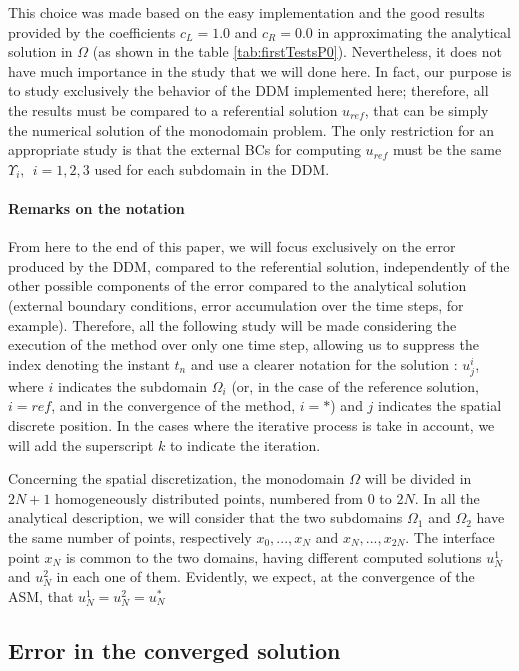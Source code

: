 \indent This choice was made based on the easy implementation and the good results provided by the coefficients $c_L = 1.0$ and $c_R = 0.0$ in approximating the analytical solution in $\Omega$ (as shown in the table \ref{tab:firstTestsP0}). Nevertheless, it does not have much importance in the study that we will done here. In fact, our purpose is to study exclusively the behavior of the DDM implemented here; therefore, all the results must be compared to a referential solution $u_{ref}$, that can be simply the numerical solution of the monodomain problem. The only restriction for an appropriate study is that the external BCs for computing $u_{ref}$ must be the same $\Upsilon_i, \ \ i=1,2,3$ used for each subdomain in the DDM.

\paragraph{Remarks on the notation}

\indent From here to the end of this paper, we will focus exclusively on the error produced by the DDM, compared to the referential solution, independently of the other possible components of the error compared to the analytical solution (external boundary conditions, error accumulation over the time steps, for example). Therefore, all the following study will be made considering the execution of the method over only one time step, allowing us to suppress the index denoting the instant $t_n$ and use a clearer notation for the solution : $u_j^i$, where $i$ indicates the subdomain $\Omega_i$ (or, in the case of the reference solution, $i = ref$, and in the convergence of the method, $i = *$) and $j$ indicates the spatial discrete position. In the cases where the iterative process is take in account, we will add the superscript $k$ to indicate the iteration.

\indent Concerning the spatial discretization, the monodomain $\Omega$ will be divided in $2N + 1$ homogeneously distributed points, numbered from $0$ to $2N$. In all the analytical description, we will consider that the two subdomains $\Omega_1$ and $\Omega_2$ have the same number of points, respectively $x_0,...,x_N$ and $x_N,...,x_{2N}$. The interface point $x_N$ is common to the two domains, having different computed solutions $u_N^1$ and $u_N^2$ in each one of them. Evidently, we expect, at the convergence of the ASM, that $u_N^1 = u_N^2 = u_N^*$

\subsection{Error in the converged solution}

